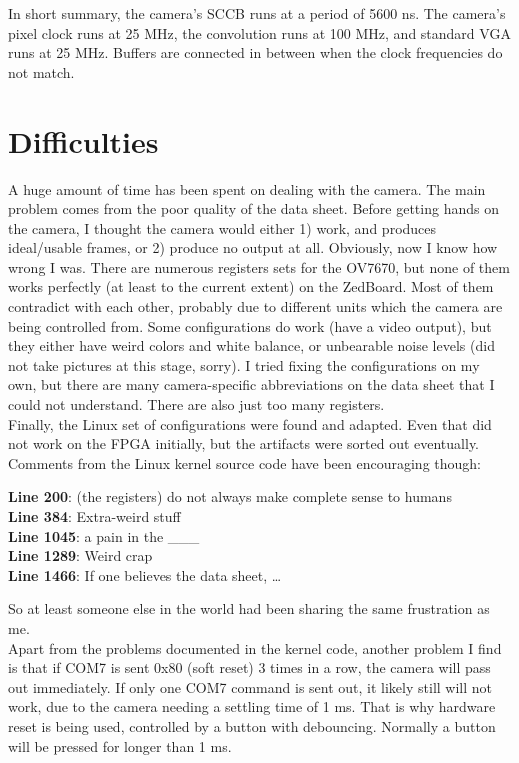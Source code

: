 \documentclass{article}
\begin{document}
	In short summary, the camera’s SCCB runs at a period of 5600 ns. The camera's pixel clock runs at 25 MHz, the convolution runs at 100 MHz, and standard VGA runs at 25 MHz. Buffers are connected in between when the clock frequencies do not match.
	\newpage\section{Difficulties}
	A huge amount of time has been spent on dealing with the camera. The main problem comes from the poor quality of the data sheet. Before getting hands on the camera, I thought the camera would either 1) work, and produces ideal/usable frames, or 2) produce no output at all. Obviously, now I know how wrong I was. There are numerous registers sets \cite{reg1}\cite{reg2}\cite{reg3}\cite{reg4}\cite{reg5} for the OV7670, but none of them works perfectly (at least to the current extent) on the ZedBoard. Most of them contradict with each other, probably due to different units which the camera are being controlled from. Some configurations do work (have a video output), but they either have weird colors and white balance, or unbearable noise levels (did not take pictures at this stage, sorry). I tried fixing the configurations on my own, but there are many camera-specific abbreviations on the data sheet that I could not understand. There are also just too many registers.
	\\
	
	Finally, the Linux set of configurations \cite{reg6} were found and adapted. Even that did not work on the FPGA initially, but the artifacts were sorted out eventually. Comments from the Linux kernel source code \cite{reg6} have been encouraging though: 
	\begin{displayquote}
		\textbf{Line 200}: (the registers) do not always make complete sense to humans\\
		\textbf{Line 384}: Extra-weird stuff\\
		\textbf{Line 1045}: a pain in the \_\_\_\\
		\textbf{Line 1289}: Weird crap\\
		\textbf{Line 1466}: If one believes the data sheet, …
	\end{displayquote}
	So at least someone else in the world had been sharing the same frustration as me.
	\\
	
	Apart from the problems documented in the kernel code, another problem I find is that if COM7 is sent 0x80 (soft reset) 3 times in a row, the camera will pass out immediately. If only one COM7 command is sent out, it likely still will not work, due to the camera needing a settling time of 1 ms. That is why hardware reset is being used, controlled by a button with debouncing. Normally a button will be pressed for longer than 1 ms.
	\\
	
\end{document}
